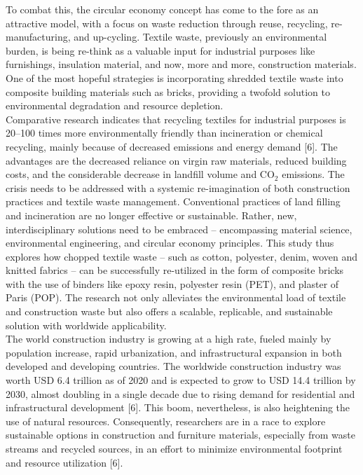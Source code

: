 \noindent To combat this, the circular economy concept has come to the fore as an attractive model, with a focus on waste reduction through reuse, recycling, re-manufacturing, and up-cycling. Textile waste, previously an environmental burden, is being re-think as a valuable input for industrial purposes like furnishings, insulation material, and now, more and more, construction materials. One of the most hopeful strategies is incorporating shredded textile waste into composite building materials such as bricks, providing a twofold solution to environmental degradation and resource depletion.\\

\noindent Comparative research indicates that recycling textiles for industrial purposes is 20--100 times more environmentally friendly than incineration or chemical recycling, mainly because of decreased emissions and energy demand [6]. The advantages are the decreased reliance on virgin raw materials, reduced building costs, and the considerable decrease in landfill volume and CO$_2$ emissions. The crisis needs to be addressed with a systemic re-imagination of both construction practices and textile waste management. Conventional practices of land filling and incineration are no longer effective or sustainable. Rather, new, interdisciplinary solutions need to be embraced -- encompassing material science, environmental engineering, and circular economy principles. This study thus explores how chopped textile waste -- such as cotton, polyester, denim, woven and knitted fabrics -- can be successfully re-utilized in the form of composite bricks with the use of binders like epoxy resin, polyester resin (PET), and plaster of Paris (POP). The research not only alleviates the environmental load of textile and construction waste but also offers a scalable, replicable, and sustainable solution with worldwide applicability. \\

\noindent The world construction industry is growing at a high rate, fueled mainly by population increase, rapid urbanization, and infrastructural expansion in both developed and developing countries. The worldwide construction industry was worth USD 6.4 trillion as of 2020 and is expected to grow to USD 14.4 trillion by 2030, almost doubling in a single decade due to rising demand for residential and infrastructural development [6]. This boom, nevertheless, is also heightening the use of natural resources. Consequently, researchers are in a race to explore sustainable options in construction and furniture materials, especially from waste streams and recycled sources, in an effort to minimize environmental footprint and resource utilization [6]. \\

